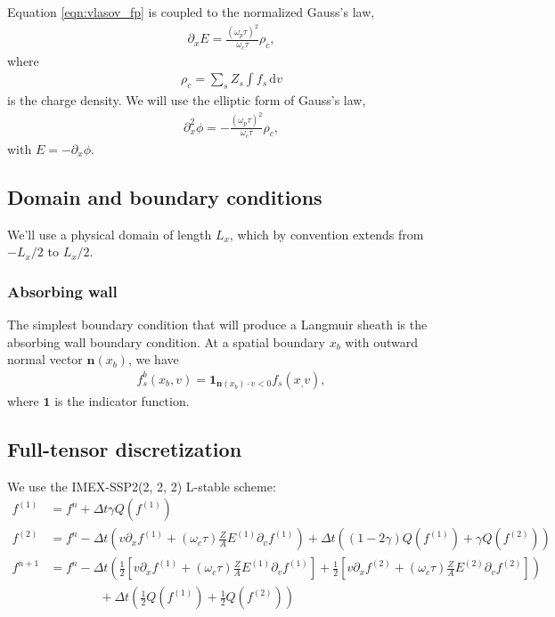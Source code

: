 \documentclass{article}
\begin{document}
Equation \eqref{eqn:vlasov_fp} is coupled to the normalized Gauss's law,
\begin{align}
\partial_x E = \frac{(\omega_p \tau)^2}{\omega_c \tau} \rho_c,
\end{align}
where
\begin{align}
    \rho_c = \sum_s Z_s \int f_s \,\mathrm{d} v
\end{align}
is the charge density.
We will use the elliptic form of Gauss's law,
\begin{align}
\partial_x^2 \phi = -\frac{(\omega_p \tau)^2}{\omega_c \tau} \rho_c,
\end{align}
with $E = -\partial_x \phi$.

\subsection{Domain and boundary conditions}

We'll use a physical domain of length $L_x$, which by convention extends from $-L_x/2$ to $L_x/2$.

\subsubsection{Absorbing wall}
The simplest boundary condition that will produce a Langmuir sheath is the absorbing wall
boundary condition. At a spatial boundary $x_b$ with outward normal vector $\mathbf{n}(x_b)$, we have
\begin{align}
    f_s^b(x_b, v) = \mathbf{1}_{\mathbf{n}(x_b) \cdot v < 0} f_s(x_, v),
\end{align}
where $\mathbf{1}$ is the indicator function.

\subsection{Full-tensor discretization}

We use the IMEX-SSP2(2, 2, 2) L-stable scheme:
\begin{align*}
    f^{(1)} &= f^n + \Delta t \gamma Q(f^{(1)}) \\
    f^{(2)} &= f^n - \Delta t  \left( v \partial_x f^{(1)} + (\omega_c \tau) \frac{Z}{A} E^{(1)} \partial_v f^{(1)} \right) + \Delta t \left( (1 - 2\gamma) Q(f^{(1)}) + \gamma Q(f^{(2)}) \right)  \\
    f^{n+1} &= f^n - \Delta t \left( \frac{1}{2} \left[ v \partial_x f^{(1)} + (\omega_c \tau) \frac{Z}{A} E^{(1)} \partial_v f^{(1)} \right]  + \frac{1}{2} \left[ v \partial_x f^{(2)} + (\omega_c \tau) \frac{Z}{A} E^{(2)} \partial_v f^{(2)} \right] \right)  \\
            &\qquad \qquad + \Delta t \left( \frac{1}{2} Q(f^{(1)}) + \frac{1}{2} Q(f^{(2)}) \right) 
\end{align*}
\end{document}
